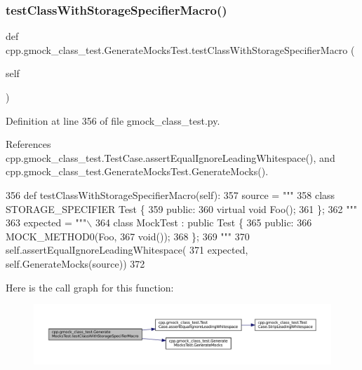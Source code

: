 \subsubsection{\texorpdfstring{test\+Class\+With\+Storage\+Specifier\+Macro()}{testClassWithStorageSpecifierMacro()}}
{\footnotesize\ttfamily def cpp.\+gmock\+\_\+class\+\_\+test.\+Generate\+Mocks\+Test.\+test\+Class\+With\+Storage\+Specifier\+Macro (\begin{DoxyParamCaption}\item[{}]{self }\end{DoxyParamCaption})}



Definition at line 356 of file gmock\+\_\+class\+\_\+test.\+py.



References cpp.\+gmock\+\_\+class\+\_\+test.\+Test\+Case.\+assert\+Equal\+Ignore\+Leading\+Whitespace(), and cpp.\+gmock\+\_\+class\+\_\+test.\+Generate\+Mocks\+Test.\+Generate\+Mocks().


\begin{DoxyCode}
356   \textcolor{keyword}{def }testClassWithStorageSpecifierMacro(self):
357     source = \textcolor{stringliteral}{"""}
358 \textcolor{stringliteral}{class STORAGE\_SPECIFIER Test \{}
359 \textcolor{stringliteral}{ public:}
360 \textcolor{stringliteral}{  virtual void Foo();}
361 \textcolor{stringliteral}{\};}
362 \textcolor{stringliteral}{"""}
363     expected = \textcolor{stringliteral}{"""\(\backslash\)}
364 \textcolor{stringliteral}{class MockTest : public Test \{}
365 \textcolor{stringliteral}{public:}
366 \textcolor{stringliteral}{MOCK\_METHOD0(Foo,}
367 \textcolor{stringliteral}{void());}
368 \textcolor{stringliteral}{\};}
369 \textcolor{stringliteral}{"""}
370     self.assertEqualIgnoreLeadingWhitespace(
371         expected, self.GenerateMocks(source))
372 
\end{DoxyCode}
Here is the call graph for this function\+:
\nopagebreak
\begin{figure}[H]
\begin{center}
\leavevmode
\includegraphics[width=350pt]{classcpp_1_1gmock__class__test_1_1GenerateMocksTest_aba1ab8ae8a897ea9c22a47bcd1524254_cgraph}
\end{center}
\end{figure}
\mbox{\label{classcpp_1_1gmock__class__test_1_1GenerateMocksTest_a706812da9e8f79a689c707b4032db2d2}} 
